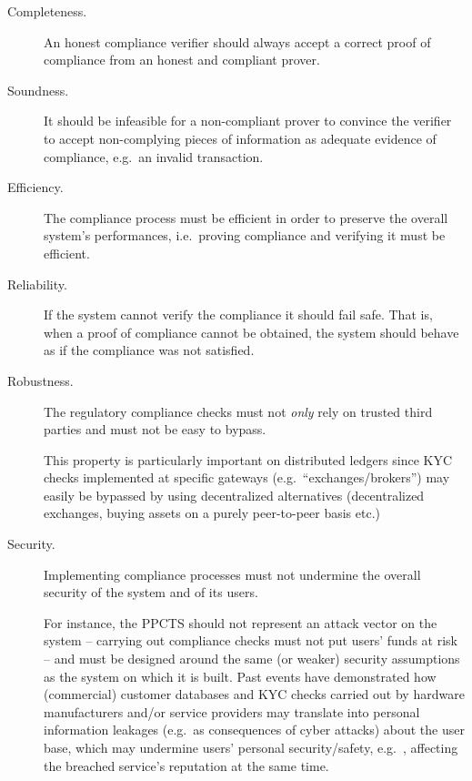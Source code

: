 \documentclass[runningheads,10pt]{llncs}
\numberwithin{equation}{section}
\begin{document}
\begin{description}
\item[{Completeness.}] An honest compliance verifier should always accept a
correct proof of compliance from an honest and compliant prover.

\item[{Soundness.}] It should be infeasible for a non-compliant prover to
convince the verifier to accept non-complying pieces of information as adequate
evidence of compliance, e.g.~an invalid transaction.

\item[{Efficiency.}] The compliance process must be efficient in order to
preserve the overall system's performances, i.e.~proving compliance and
verifying it must be efficient.

\item[{Reliability.}] If the system cannot verify the compliance it should
fail safe. That is, when a proof of compliance cannot be obtained, the system
should behave as if the compliance was not satisfied.

\item[{Robustness.}] The regulatory compliance checks must not \emph{only}
rely on trusted third parties and must not be easy to bypass.

This property is particularly important on distributed ledgers since KYC checks
implemented at specific gateways (e.g.~``exchanges/brokers'') may easily be
bypassed by using decentralized alternatives (decentralized exchanges, buying
assets on a purely peer-to-peer basis etc.)

\item[{Security.}] Implementing compliance processes must not undermine the
overall security of the system and of its users.

For instance, the PPCTS should not represent an attack vector on the system --
carrying out compliance checks must not put users' funds at risk -- and must be
designed around the same (or weaker) security assumptions as the system on which
it is built. Past events have demonstrated how (commercial) customer databases
and KYC checks carried out by hardware manufacturers and/or service providers
may translate into personal information leakages (e.g.~as consequences of cyber
attacks) about the user base, which may undermine users' personal
security/safety, e.g.~\cite{forbes-ledger-hack,ledger-hack-fear}, affecting the
breached service's reputation at the same time.  


\end{description}
\end{document}
